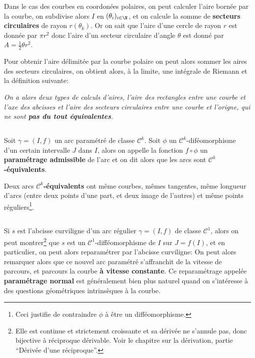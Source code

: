 Dans le cas des courbes en coordonées polaires, on peut calculer l'aire bornée par la courbe, on subdivise alors \(I\) en \((\theta_i)_{i \in \N}\), et on calcule la somme de \textbf{secteurs circulaires} de rayon \(r(\theta_k)\). Or on sait que l'aire d'une cercle de rayon \(r\) est donnée par \(\pi r^2\) donc l'aire d'un secteur circulaire d'angle \(\theta\) est donné par \(A = \frac{1}{2}\theta r^2\).\<

Pour obtenir l'aire délimitée par la courbe polaire on peut alors sommer les aires des secteurs circulaires, on obtient alors, à la limite, une intégrale de Riemann et la définition suivante:
\begin{center}
   \textit{
      On a alors deux types de calculs d'aires, l'aire des rectangles entre une courbe et l'axe des abcisses et l'aire des secteurs circulaires entre une courbe et l'origne, qui ne sont \textbf{pas du tout équivalentes}.
   }
\end{center}

\subsection*{}
Soit \(\gamma = (I, f)\) un arc paramétré de classe \(\mathcal{C}^k\). Soit \(\phi\) un \(\mathcal{C}^k\)-diféomorphisme d'un certain intervalle \(J\) dans \(I\), alors on appelle la fonction \(f \circ \phi\) un \textbf{paramétrage admissible} de l'arc et on dit alors que les arcs sont \(\mathcal{C}^k\)\textbf{-équivalents}.\<

Deux arcs \(\mathcal{C}^k\)\textbf{-équivalents} ont même courbes, mêmes tangentes, même longueur d'arcs (entre deux points d'une part, et deux image de l'autres) et même points réguliers\footnote[2]{Ceci justifie de contraindre \(\phi\) à être un difféomorphisme.}.

\subsection*{}
Si \(s\) est l'abcisse curviligne d'un arc régulier \(\gamma = (I, f)\) de classe \(\mathcal{C}^1\), alors on peut montrer\footnote[3]{Elle est continue et strictement croissante et sa dérivée ne s'annule pas, donc bijective à réciproque dérivable. Voir le chapitre sur la dérivation, partie ``Dérivée d'une réciproque''.} que \(s\) est un \(\mathcal{C}^1\)-difféomorphisme de \(I\) sur \(J = f(I)\), et en particulier, on peut alors reparamétrer par l'abcisse curviligne:
On peut alors remarquer alors que ce nouvel arc paramétré s'affranchit de la vitesse de parcours, et parcours la courbe \textbf{à vitesse constante}. Ce reparamétrage appelée \textbf{paramétrage normal} est généralement bien plus naturel quand on s'intéresse à des questions géométriques intrinsèques à la courbe.
